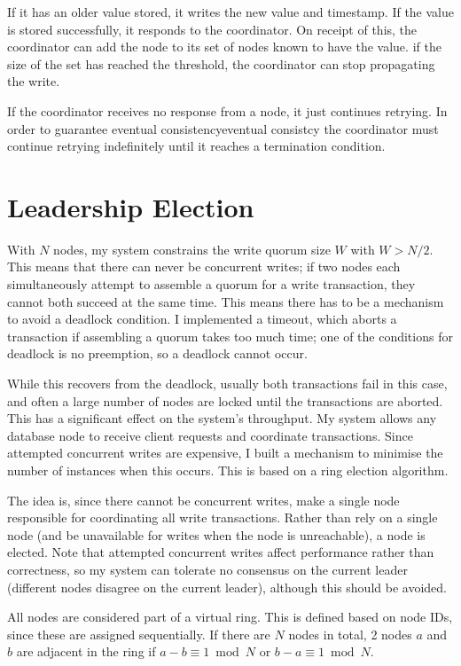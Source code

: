 \documentclass[12pt,a4paper,twoside,openany]{report}
\begin{document}
If it has an older value stored, it writes the new value and timestamp. If the value is stored successfully, it responds to the coordinator. On receipt of this, the coordinator can add the node to its set of nodes known to have the value. if the size of the set has reached the threshold, the coordinator can stop propagating the write.

If the coordinator receives no response from a node, it just continues retrying. In order to guarantee eventual consistencyeventual consistcy the coordinator must continue retrying indefinitely until it reaches a termination condition.

\section{Leadership Election}

With $N$ nodes, my system constrains the write quorum size $W$ with $W > N / 2$. This means that there can never be concurrent writes; if two nodes each simultaneously attempt to assemble a quorum for a write transaction, they cannot both succeed at the same time. This means there has to be a mechanism to avoid a deadlock condition. I implemented a timeout, which aborts a transaction if assembling a quorum takes too much time; one of the conditions for deadlock is no preemption, so a deadlock cannot occur.

While this recovers from the deadlock, usually both transactions fail in this case, and often a large number of nodes are locked until the transactions are aborted. This has a significant effect on the system's throughput. My system allows any database node to receive client requests and coordinate transactions. Since attempted concurrent writes are expensive, I built a mechanism to minimise the number of instances when this occurs. This is based on a ring election algorithm.

The idea is, since there cannot be concurrent writes, make a single node responsible for coordinating all write transactions. Rather than rely on a single node (and be unavailable for writes when the node is unreachable), a node is elected. Note that attempted concurrent writes affect performance rather than correctness, so my system can tolerate no consensus on the current leader (different nodes disagree on the current leader), although this should be avoided.

All nodes are considered part of a virtual ring. This is defined based on node IDs, since these are assigned sequentially. If there are $N$ nodes in total, 2 nodes $a$ and $b$ are adjacent in the ring if $a-b \equiv 1 \bmod N$ or $b-a \equiv 1 \bmod N$.
\end{document}
